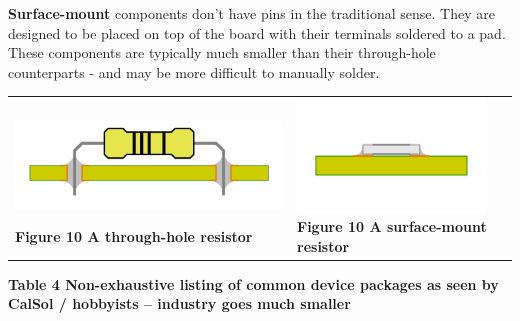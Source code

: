 \documentclass[letterpaper]{article}
\begin{document}
{\sffamily\color[rgb]{0.30980393,0.5058824,0.7411765}
\textbf{Surface-mount} components don't have {\textquotedbl}pins{\textquotedbl} in the traditional sense. They are
designed to be placed on top of the board with their terminals soldered to a pad. These components are typically much
smaller than their through-hole counterparts - and may be more difficult to manually solder. }

\begin{flushleft}
\tablefirsthead{}
\tablehead{}
\tabletail{}
\tablelasttail{}
\begin{supertabular}{m{3.7275598in}m{3.6150599in}}
 \includegraphics[width=3.5457in,height=1.1819in]{figures/ee4document-img009.png} 
{\sffamily\bfseries\color[rgb]{0.30980393,0.5058824,0.7411765} Figure 10 A through-hole
resistor} &
 \includegraphics[width=1.9728in,height=1.1819in]{figures/ee4document-img010.png} 
{\sffamily\bfseries\color[rgb]{0.30980393,0.5058824,0.7411765} Figure 10 A surface-mount
resistor}\\
\end{supertabular}
\end{flushleft}
{\sffamily\bfseries\color[rgb]{0.30980393,0.5058824,0.7411765}
Table 4 Non-exhaustive listing of common device packages as seen by CalSol / hobbyists -- industry goes much smaller}
\end{document}
